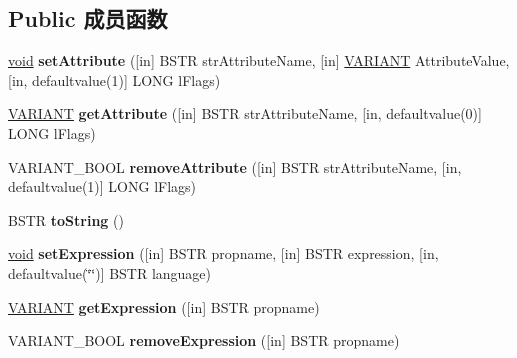 \subsection*{Public 成员函数}
\begin{DoxyCompactItemize}
\item 
\mbox{\label{interface_m_s_h_t_m_l_1_1_disp_h_t_m_l_style_a8fca5ef2ab6f4f7d41601ee06ff52b03}} 
\hyperlink{interfacevoid}{void} {\bfseries set\+Attribute} (\mbox{[}in\mbox{]} B\+S\+TR str\+Attribute\+Name, \mbox{[}in\mbox{]} \hyperlink{structtag_v_a_r_i_a_n_t}{V\+A\+R\+I\+A\+NT} Attribute\+Value, \mbox{[}in, defaultvalue(1)\mbox{]} L\+O\+NG l\+Flags)
\item 
\mbox{\label{interface_m_s_h_t_m_l_1_1_disp_h_t_m_l_style_a179240647e0391093841fbb241a3cec2}} 
\hyperlink{structtag_v_a_r_i_a_n_t}{V\+A\+R\+I\+A\+NT} {\bfseries get\+Attribute} (\mbox{[}in\mbox{]} B\+S\+TR str\+Attribute\+Name, \mbox{[}in, defaultvalue(0)\mbox{]} L\+O\+NG l\+Flags)
\item 
\mbox{\label{interface_m_s_h_t_m_l_1_1_disp_h_t_m_l_style_a3df1e5fa8d0603d74eeadf7c9aeee16b}} 
V\+A\+R\+I\+A\+N\+T\+\_\+\+B\+O\+OL {\bfseries remove\+Attribute} (\mbox{[}in\mbox{]} B\+S\+TR str\+Attribute\+Name, \mbox{[}in, defaultvalue(1)\mbox{]} L\+O\+NG l\+Flags)
\item 
\mbox{\label{interface_m_s_h_t_m_l_1_1_disp_h_t_m_l_style_a0f6ac2e099f0b8901fd7d1226a19c840}} 
B\+S\+TR {\bfseries to\+String} ()
\item 
\mbox{\label{interface_m_s_h_t_m_l_1_1_disp_h_t_m_l_style_af45d16ccea2ba27a75ffb54fdc0a70be}} 
\hyperlink{interfacevoid}{void} {\bfseries set\+Expression} (\mbox{[}in\mbox{]} B\+S\+TR propname, \mbox{[}in\mbox{]} B\+S\+TR expression, \mbox{[}in, defaultvalue(\char`\"{}\char`\"{})\mbox{]} B\+S\+TR language)
\item 
\mbox{\label{interface_m_s_h_t_m_l_1_1_disp_h_t_m_l_style_a4d43f23c05829e03300d7b5a288e0785}} 
\hyperlink{structtag_v_a_r_i_a_n_t}{V\+A\+R\+I\+A\+NT} {\bfseries get\+Expression} (\mbox{[}in\mbox{]} B\+S\+TR propname)
\item 
\mbox{\label{interface_m_s_h_t_m_l_1_1_disp_h_t_m_l_style_ac244f1fc30f56c1e0767b0490628b2f2}} 
V\+A\+R\+I\+A\+N\+T\+\_\+\+B\+O\+OL {\bfseries remove\+Expression} (\mbox{[}in\mbox{]} B\+S\+TR propname)
\end{DoxyCompactItemize}
